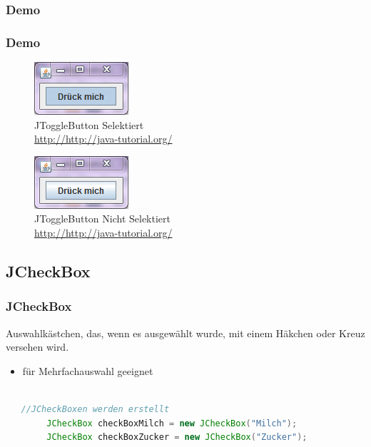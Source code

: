 \documentclass[xcolor=dvipsnames]{beamer}
\begin{document}
\subsubsection{Demo}
\begin{frame}
  \frametitle{Demo}
	\begin{figure}
		\includegraphics[scale=1.0]{images/jtogglebutton_selected.PNG}
		\caption{JToggleButton Selektiert\\ \tiny{\textcolor{gray}{\url{http://http://java-tutorial.org/}}}}
		\end{figure}
\begin{figure}
		\includegraphics[scale=1.0]{images/jtogglebutton_notselected.PNG}
		\caption{JToggleButton Nicht Selektiert \\ \tiny{\textcolor{gray}{\url{http://http://java-tutorial.org/}}}}
		\end{figure}
\end{frame}


\subsection{JCheckBox}
\begin{frame}  %
  \frametitle{JCheckBox} %
  \begin{block}{Auswahlkästchen, das, wenn es ausgewählt wurde, mit einem Häkchen oder Kreuz versehen wird.}
	  \begin{itemize}
		\item für Mehrfachauswahl geeignet
	  \end{itemize}
  \end{block}

\begin{lstlisting}[language=java,basicstyle=\scriptsize\ttfamily]

   //JCheckBoxen werden erstellt
        JCheckBox checkBoxMilch = new JCheckBox("Milch");
        JCheckBox checkBoxZucker = new JCheckBox("Zucker");

\end{lstlisting}

\end{frame}
\end{document}
